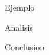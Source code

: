 \documentclass[preprint,12pt]{elsarticle}
\begin{document}
	

\begin{LARGE}
		Ejemplo\\
	\end{LARGE}
	
	\begin{LARGE}
		Analisis\\
	\end{LARGE}
\newpage
\begin{LARGE}
		Conclusion\\
	\end{LARGE}
	
	\newpage
	
	
	
	
	
	
	
	
	
	
	
	
	
	
\end{document}

